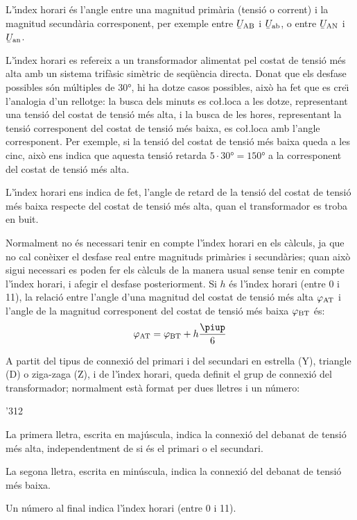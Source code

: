 L'\'{\i}ndex horari \'{e}s l'angle entre una magnitud  prim\`{a}ria (tensi\'{o} o corrent) i la magnitud secund\`{a}ria corresponent, per exemple entre $\cmplx{U}\ped{AB}$ i $\cmplx{U}\ped{ab}$, o entre $\cmplx{U}\ped{AN}$ i $\cmplx{U}\ped{an}$.

L'\'{\i}ndex horari es refereix a un transformador alimentat pel costat de tensi\'{o} m\'{e}s alta  amb un sistema trif\`{a}sic sim\`{e}tric de seq\"{u}\`{e}ncia directa. Donat que els desfase possibles s\'{o}n m\'{u}ltiples de $30\unit{\degree}$, hi ha dotze casos possibles, aix\`{o} ha fet que es cre\"{\i} l'analogia d'un rellotge: la busca dels minuts es co{\l.l}oca a les dotze, representant una tensi\'{o} del costat de tensi\'{o} m\'{e}s alta, i la busca de les hores, representant la tensi\'{o} corresponent del costat de tensi\'{o} m\'{e}s baixa, es co{\l.l}oca amb l'angle corresponent. Per exemple, si la tensi\'{o} del costat de tensi\'{o} m\'{e}s baixa queda a les cinc, aix\`{o} ens indica que aquesta tensi\'{o} retarda $5\cdot 30\unit{\degree}= 150\unit{\degree}$ a la corresponent del costat de tensi\'{o} m\'{e}s alta.

L'\'{\i}ndex horari ens indica de fet, l'angle de retard de la tensi\'{o} del costat de tensi\'{o} m\'{e}s baixa respecte del costat de tensi\'{o} m\'{e}s alta, quan el transformador es troba en buit.

Normalment no \'{e}s necessari tenir en compte l'\'{\i}ndex horari en els c\`{a}lculs, ja que no cal con\`{e}ixer el desfase real entre magnituds prim\`{a}ries i secund\`{a}ries; quan aix\`{o} sigui necessari es poden fer els c\`{a}lculs de la manera usual sense tenir en compte l'\'{\i}ndex horari, i afegir el desfase posteriorment. Si $h$ \'{e}s l'\'{\i}ndex horari (entre 0 i 11), la relaci\'{o} entre l'angle d'una magnitud del costat de tensi\'{o} m\'{e}s alta $\varphi_\mathrm{AT}$ i l'angle de la magnitud corresponent del costat de tensi\'{o} m\'{e}s baixa $\varphi_\mathrm{BT}$ \'{e}s:
\begin{equation}
    \varphi\ped{AT} = \varphi\ped{BT} + h\frac{\piup}{6}\label{eq:fi-AT-BT}
\end{equation}


A partit del tipus de connexi\'{o} del primari i del secundari en estrella (Y), triangle (D) o ziga-zaga (Z), i de l'\'{\i}ndex horari, queda definit el grup de connexi\'{o} del transformador; normalment est\`{a} format per dues lletres i un n\'{u}mero:
\begin{dingautolist}{'312}
   \item La primera lletra, escrita en maj\'{u}scula, indica la connexi\'{o} del debanat de tensi\'{o} m\'{e}s alta, independentment de si \'{e}s el primari o el secundari.
   \item La segona lletra, escrita en min\'{u}scula, indica la connexi\'{o} del debanat de tensi\'{o} m\'{e}s baixa.
   \item Un n\'{u}mero al final indica l'\'{\i}ndex horari (entre 0 i 11).
\end{dingautolist}

